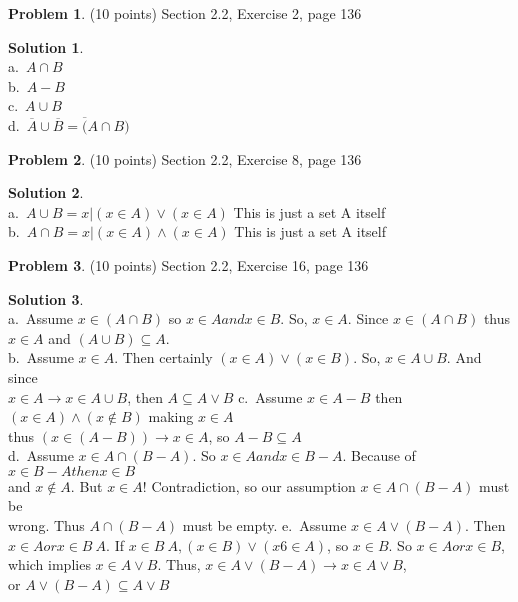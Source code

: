 \documentclass{article}
\theoremstyle{definition}
\newtheorem{problem}{Problem}
\newtheorem*{solution}{Solution}
\begin{document}
\begin{problem} (10 points)
Section 2.2, Exercise 2, page 136
\end{problem}
\begin{solution}~\\
a.\ $A \cap B$ \\
b.\ $A - B$ \\
c.\ $A \cup B$ \\
d.\ $\overline A \cup \overline B = \overline(A \cap B)$ \\
\end{solution}

\begin{problem} (10 points)
Section 2.2, Exercise 8, page 136
\end{problem}
\begin{solution}~\\
a.\ $A \cup B = {x|(x \in A) \lor (x \in A)}$ This is just a set A itself \\
b.\ $A \cap B = {x|(x \in A) \land (x \in A)}$ This is just a set A itself \\
\end{solution}

\begin{problem} (10 points)
Section 2.2, Exercise 16, page 136
\end{problem}
\begin{solution}~\\
a.\ Assume $x \in (A ∩ B)$ so $x \in A and x \in B$. So, $x \in A$. Since $x \in (A ∩ B)$ thus $x \in A$ and $(A \cup B) \subseteq A$. \\
b.\ Assume $x \in A$. Then certainly $(x \in A) \lor (x \in B)$. So, $x \in A \cup B$. And since \\
   $x \in A \to x \in A \cup B$, then $A \subseteq A \lor B$
c.\ Assume $x \in A-B$ then $(x \in A)\land(x \notin B)$ making $x \in A$ \\
    thus $(x \in (A-B)) \to x \in A$, so $A-B \subseteq A$ \\
d.\ Assume $x \in A \cap (B - A)$. So $x \in A and x \in B-A$. Because of $x \in B-A then x \in B$ \\
   and $x \notin A$. But $x \in A!$ Contradiction, so our assumption $x \in A \cap (B-A)$ must be \\
   wrong. Thus $A \cap (B - A)$ must be empty.
e.\ Assume $x \in A \lor (B-A)$. Then $x \in A or x \in B \ A$. 
   If $x \in B \ A,(x \in B) \lor (x 6\in A)$, so $x \in B$. So $x \in A or x \in B$, \\
   which implies $x \in A \lor B$. Thus, $x \in A \lor (B - A) \to x \in A \lor B$, \\
   or $A \lor (B - A) ⊆ A \lor B $ \\
\end{solution}
\end{document}
